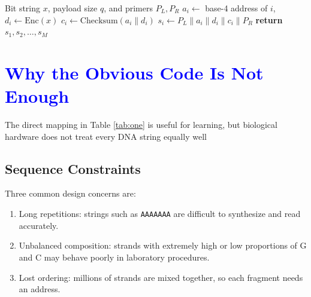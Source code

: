 \documentclass{article}
\begin{document}
\begin{algorithm}
    \caption{Create addressed DNA strands}
    \label{alg:one}
    \begin{algorithmic}[1]
        \Require Bit string $x$, payload size $q$, and primers $P_L, P_R$
        \State $a_i \leftarrow$ base-4 address of $i$, $d_i\leftarrow \text{Enc}(x)$
        \State $c_i \leftarrow \text{Checksum}(a_i\parallel d_i)$
        \State $s_i \leftarrow P_L \parallel a_i \parallel d_i \parallel c_i \parallel P_R$
        \EndFor
        \State \textbf{return} \(s_1, s_2, \ldots, s_M \)
        \EndProcedure
    \end{algorithmic}
\end{algorithm}

\section{\textcolor{blue}{Why the Obvious Code Is Not Enough}}

The direct mapping in Table \ref{tab:one} is useful for learning, but biological hardware does not treat every DNA
string equally well


\subsection{Sequence Constraints}
Three common design concerns are:

\begin{enumerate}[label=$\diamond$]
    \item Long repetitions: strings such as \texttt{AAAAAAA} are difficult to synthesize and read accurately.
    \item Unbalanced composition: strands with extremely high or low proportions of G and C may behave poorly in laboratory procedures.
    \item Lost ordering: millions of strands are mixed together, so each fragment needs an address.
\end{enumerate}
\end{document}
